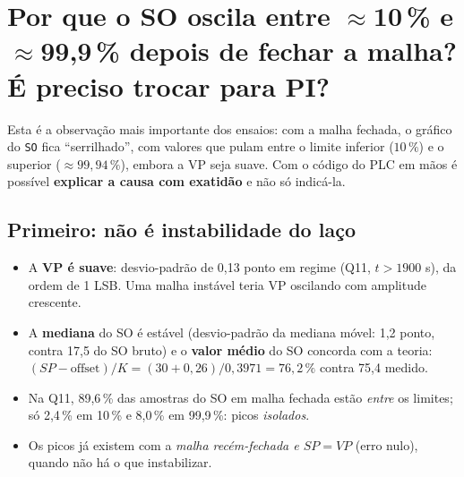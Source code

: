 \section{Por que o SO oscila entre $\approx$10\,\% e $\approx$99,9\,\% depois de fechar a malha? É preciso trocar para PI?}\label{expruido}
Esta é a observação mais importante dos ensaios: com a malha fechada, o gráfico do \texttt{SO} fica ``serrilhado'', com valores que pulam entre o limite inferior ($10\,\%$) e o superior ($\approx99{,}94\,\%$), embora a VP seja suave. Com o código do PLC em mãos é possível \textbf{explicar a causa com exatidão} e não só indicá-la.
\subsection{Primeiro: não é instabilidade do laço}
\begin{itemize}
\item A \textbf{VP é suave}: desvio-padrão de 0,13 ponto em regime (Q11, $t>1900$ s), da ordem de 1 LSB. Uma malha instável teria VP oscilando com amplitude crescente.
\item A \textbf{mediana} do SO é estável (desvio-padrão da mediana móvel: 1,2 ponto, contra 17,5 do SO bruto) e o \textbf{valor médio} do SO concorda com a teoria: $(SP-\text{offset})/K=(30+0{,}26)/0{,}3971=76{,}2\,\%$ contra 75,4 medido.
\item Na Q11, 89,6\,\% das amostras do SO em malha fechada estão \emph{entre} os limites; só 2,4\,\% em 10\,\% e 8,0\,\% em 99,9\,\%: picos \emph{isolados}.
\item Os picos já existem com a \emph{malha recém-fechada e $SP=VP$} (erro nulo), quando não há o que instabilizar.
\end{itemize}
